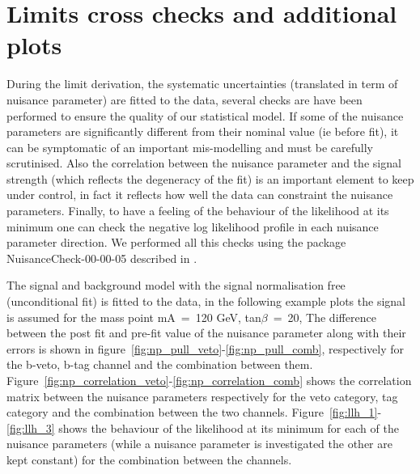 \clearpage

\chapter{Limits cross checks and additional plots}
\label{appendix:limit}

During the limit derivation, the systematic uncertainties (translated in term of nuisance parameter) are fitted to the data,
several checks are have been performed to ensure the quality of our statistical model.
If some of the nuisance parameters are significantly different from their nominal value 
(ie before fit), it can be symptomatic of an important mis-modelling and must be carefully scrutinised.
Also the correlation between the nuisance parameter and the signal strength (which reflects the degeneracy of the fit) 
is an important element to keep under control, in fact it reflects how well the data can constraint the nuisance parameters.
Finally, to have a feeling of the behaviour of the likelihood at its minimum one can check 
the negative log likelihood profile in each nuisance parameter direction. 
We performed all this checks using the package NuisanceCheck-00-00-05 described in \cite{NPcheck}.

The signal and background model with the signal normalisation free (unconditional fit) is fitted to the data,
in the following example plots the signal is assumed for the mass point mA~=~120 GeV, tan$\beta$~=~20,  
The difference between the post fit and pre-fit value of the nuisance parameter along with their errors is shown in figure~\ref{fig:np_pull_veto}-\ref{fig:np_pull_comb},
respectively for the b-veto, b-tag channel and the combination between them.
Figure~\ref{fig:np_correlation_veto}-\ref{fig:np_correlation_comb} shows the correlation matrix between the nuisance parameters respectively for
the veto category, tag category and the combination between the two channels.
Figure~\ref{fig:llh_1}-\ref{fig:llh_3} shows the behaviour of the likelihood at its minimum for 
each of the nuisance parameters (while a nuisance parameter is investigated the other are kept constant) for the combination between the channels.

